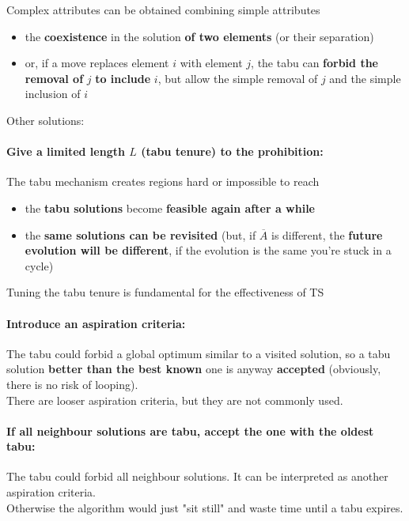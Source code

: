 Complex attributes can be obtained combining simple attributes
\begin{itemize}
	\item the \textbf{coexistence} in the solution \textbf{of two elements} (or their separation) 
	\item or, if a move replaces element $i$ with element $j$, the tabu can \textbf{forbid the removal of} $j$ \textbf{to include} $i$, but allow the simple removal of $j$ and the simple inclusion of $i$
\end{itemize}

\newpage

Other solutions:

\paragraph{Give a limited length $L$ (tabu tenure) to the prohibition:} The tabu mechanism creates regions hard or impossible to reach
\begin{itemize}
	\item the \textbf{tabu solutions} become \textbf{feasible again after a while}
	
	\item the \textbf{same solutions can be revisited} (but, if $\overline{A}$ is different, the \textbf{future evolution will be different}, if the evolution is the same you're stuck in a cycle)
\end{itemize}

Tuning the tabu tenure is fundamental for the effectiveness of TS\\

\paragraph{Introduce an aspiration criteria:} The tabu could forbid a global optimum similar to a visited solution, so a tabu solution \textbf{better than the best known} one is anyway \textbf{accepted} (obviously, there is no risk of looping).\\

There are looser aspiration criteria, but they are not commonly used.\\

\paragraph{If all neighbour solutions are tabu, accept the one with the oldest tabu:} The tabu could forbid all neighbour solutions. It can be interpreted as another aspiration criteria.\\
Otherwise the algorithm would just "sit still" and waste time until a tabu expires.\\

